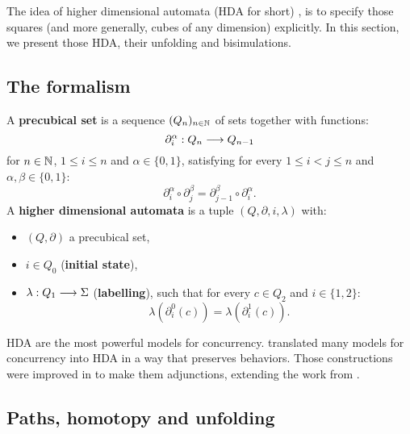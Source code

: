 	The idea of higher dimensional automata (HDA for short) \cite{pratt91}, is to specify those squares (and more generally, cubes of any dimension) explicitly. In this section, we present those HDA, their unfolding and bisimulations.

	\subsection{The formalism}

	A \textbf{precubical set} is a sequence $(Q_n)_{n\in \mathbb{N}}$ of sets together with functions:
	$$\partial_i^\alpha : Q_n \longrightarrow Q_{n-1}$$
	for $n \in \mathbb{N}$, $1 \leq i \leq n$ and $\alpha \in \{0,1\}$, satisfying for every $1 \leq i < j \leq n$ and $\alpha, \beta \in \{0,1\}$:
	$$\partial_i^\alpha\circ\partial_j^\beta = \partial_{j-1}^\beta\circ\partial_i^\alpha.$$
	A \textbf{higher dimensional automata} is a tuple $(Q,\partial, i, \lambda)$ with:
	\begin{itemize}
		\item $(Q,\partial)$  a precubical set,
		\item $i \in Q_0$ (\textbf{initial state}),
		\item $\lambda : Q_1 \longrightarrow \Sigma$ (\textbf{labelling}), such that for every $c \in Q_2$ and $i \in \{1,2\}$:
			$$\lambda(\partial_i^0(c)) = \lambda(\partial_i^1(c)).$$
				
				\begin{figure}[H]
					\begin{center}
    						
  					\end{center}
				\end{figure}
	\end{itemize}
	
	HDA are the most powerful models for concurrency. \cite{vanglabbeek05} translated many models for concurrency into HDA in a way that preserves behaviors. Those constructions were improved in \cite{goubault12} to make them adjunctions, extending the work from \cite{nielsen95}.

	
	\subsection{Paths, homotopy and unfolding}
	
